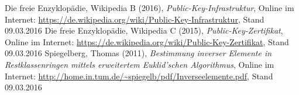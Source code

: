 \documentclass[a4paper, fontsize=12pt, parskip=full, toc=bibliographynumbered]{scrreprt}
\begin{document}
\begin{thebibliography}{9}
 Die freie Enzyklopädie, Wikipedia B (2016), \emph{Public-Key-Infrastruktur}, Online im Internet: \url{https://de.wikipedia.org/wiki/Public-Key-Infrastruktur}, Stand 09.03.2016
 Die freie Enzyklopädie, Wikipedia C (2015), \emph{Public-Key-Zertifikat}, Online im Internet: \url{https://de.wikipedia.org/wiki/Public-Key-Zertifikat}, Stand 09.03.2016
 Spiegelberg, Thomas (2011), \emph{Bestimmung inverser Elemente in Restklassenringen mittels erweitertem Euklid'schen Algorithmus}, Online im Internet: \url{http://home.in.tum.de/~spiegelb/pdf/Inverseelemente.pdf}, Stand 09.03.2016
\end{thebibliography}
\end{document}
